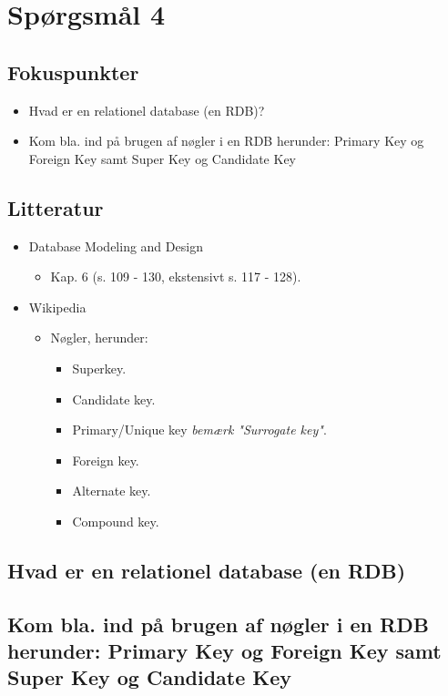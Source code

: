\section{Spørgsmål 4}

\subsection{Fokuspunkter}
\begin{itemize}
	\item Hvad er en relationel database (en RDB)?
	\item Kom bla. ind på brugen af nøgler i en RDB herunder: Primary Key og Foreign Key samt Super Key og Candidate Key
\end{itemize}

\subsection{Litteratur}
\begin{itemize}
	\item Database Modeling and Design
	\begin{itemize}
		\item Kap. 6 (s. 109 - 130, ekstensivt s. 117 - 128).
	\end{itemize}
	\item Wikipedia
	\begin{itemize}
		\item Nøgler, herunder:
		\begin{itemize}
			\item Superkey.
			\item Candidate key.
			\item Primary/Unique key \textit{bemærk "Surrogate key"}.
			\item Foreign key.
			\item Alternate key.
			\item Compound key.
		\end{itemize}
	\end{itemize}
\end{itemize}

\subsection{Hvad er en relationel database (en RDB)}

\subsection{Kom bla. ind på brugen af nøgler i en RDB herunder: Primary Key og Foreign Key samt Super Key og Candidate Key}